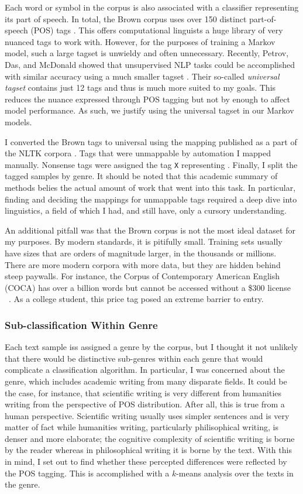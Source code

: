 \documentclass[12pt, titlepage]{article}
\begin{document}
Each word or symbol in the corpus is also associated with a classifier representing its part of speech. In total, the Brown corpus uses over 150 distinct part-of-speech (POS) tags \cite{BrownManual}. This offers computational linguists a huge library of very nuanced tags to work with. However, for the purposes of training a Markov model, such a large tagset is unwieldy and often unnecessary. Recently, Petrov, Das, and McDonald showed that unsupervised NLP tasks could be accomplished with similar accuracy using a much smaller tagset \cite{Universal}. Their so-called \textit{universal tagset} contains just 12 tags and thus is much more suited to my goals. This reduces the nuance expressed through POS tagging but not by enough to affect model performance. As such, we justify using the universal tagset in our Markov models.

I converted the Brown tags to universal using the mapping published as a part of the NLTK corpora \cite{NLTK}. Tags that were unmappable by automation I mapped manually. Nonsense tags were assigned the tag \verb|X| representing . Finally, I split the tagged samples by genre. It should be noted that this academic summary of methods belies the actual amount of work that went into this task. In particular, finding and deciding the mappings for unmappable tags required a deep dive into linguistics, a field of which I had, and still have, only a cursory understanding.

An additional pitfall was that the Brown corpus is not the most ideal dataset for my purposes. By modern standards, it is pitifully small. Training sets usually have sizes that are orders of magnitude larger, in the thousands or millions. There are more modern corpora with more data, but they are hidden behind steep paywalls. For instance, the Corpus of Contemporary American English (COCA) has over a billion words but cannot be accessed without a \$300 license ~\cite{COCA}. As a college student, this price tag posed an extreme barrier to entry.

\subsubsection{Sub-classification Within Genre}
Each text sample iss assigned a genre by the corpus, but I thought it not unlikely that there would be distinctive sub-genres within each genre that would complicate a classification algorithm. In particular, I was concerned about the  genre, which includes academic writing from many disparate fields. It could be the case, for instance, that scientific writing is very different from humanities writing from the perspective of POS distribution. After all, this is true from a human perspective. Scientific writing usually uses simpler sentences and is very matter of fact while humanities writing, particularly philisophical writing, is denser and more elaborate; the cognitive complexity of scientific writing is borne by the reader whereas in philosophical writing it is borne by the text. With this in mind, I set out to find whether these percepted differences were reflected by the POS tagging. This is accomplished with a $k$-means analysis over the texts in the genre.
\end{document}
